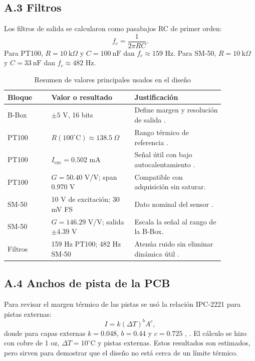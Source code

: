 \documentclass[conference]{IEEEtran}
\begin{document}
\subsection*{A.3 Filtros}

Los filtros de salida se calcularon como pasabajos RC de primer orden:
\begin{equation}
f_c=\frac{1}{2\pi RC}.
\end{equation}
Para PT100, $R=10~\text{k}\Omega$ y $C=100~\text{nF}$ dan $f_c\approx159$ Hz. Para SM-50, $R=10~\text{k}\Omega$ y $C=33~\text{nF}$ dan $f_c\approx482$ Hz.

\begin{table}[H]
\caption{Resumen de valores principales usados en el diseño}
\label{tab:valores}
\centering
\scriptsize
\begin{tabular}{@{}p{0.18\linewidth} p{0.31\linewidth} p{0.37\linewidth}@{}}
\toprule
Bloque & Valor o resultado & Justificación \\
\midrule
B-Box & $\pm5$ V, 16 bits & Define margen y resolución de salida \cite{imperix}. \\
PT100 & $R(100^\circ\text{C})\approx138.5~\Omega$ & Rango térmico de referencia \cite{bipm}. \\
PT100 & $I_{\text{exc}}=0.502$ mA & Señal útil con bajo autocalentamiento \cite{ti_rtd}. \\
PT100 & $G=50.40$ V/V; span 0.970 V & Compatible con adquisición sin saturar. \\
SM-50 & 10 V de excitación; 30 mV FS & Dato nominal del sensor \cite{interface}. \\
SM-50 & $G=146.29$ V/V; salida $\pm4.39$ V & Escala la señal al rango de la B-Box. \\
Filtros & 159 Hz PT100; 482 Hz SM-50 & Atenúa ruido sin eliminar dinámica útil \cite{adi_paths}. \\
\bottomrule
\end{tabular}
\end{table}

\subsection*{A.4 Anchos de pista de la PCB}

Para revisar el margen térmico de las pistas se usó la relación IPC-2221 para pistas externas:
\begin{equation}
I=k(\Delta T)^bA^c,
\end{equation}
donde para capas externas $k=0.048$, $b=0.44$ y $c=0.725$ \cite{digikey_trace}, \cite{cirexx_trace}. El cálculo se hizo con cobre de 1 oz, $\Delta T=10^\circ$C y pistas externas. Estos resultados son estimados, pero sirven para demostrar que el diseño no está cerca de un límite térmico.
\end{document}

